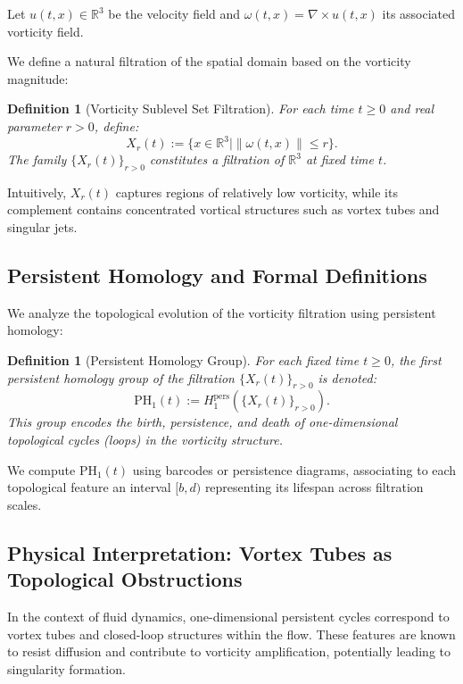 \documentclass[11pt]{article}
\newtheorem{definition}[theorem]{Definition}
\begin{document}
Let \( u(t,x) \in \mathbb{R}^3 \) be the velocity field and \( \omega(t,x) = \nabla \times u(t,x) \) its associated vorticity field.

We define a natural filtration of the spatial domain based on the vorticity magnitude:

\begin{definition}[Vorticity Sublevel Set Filtration]
For each time \( t \geq 0 \) and real parameter \( r > 0 \), define:
\[
X_r(t) := \{ x \in \mathbb{R}^3 \mid \|\omega(t,x)\| \leq r \}.
\]
The family \( \{ X_r(t) \}_{r > 0} \) constitutes a filtration of \( \mathbb{R}^3 \) at fixed time \( t \).
\end{definition}

Intuitively, \( X_r(t) \) captures regions of relatively low vorticity, while its complement contains concentrated vortical structures such as vortex tubes and singular jets.

\subsection{Persistent Homology and Formal Definitions}

We analyze the topological evolution of the vorticity filtration using persistent homology:

\begin{definition}[Persistent Homology Group]
For each fixed time \( t \geq 0 \), the first persistent homology group of the filtration \( \{ X_r(t) \}_{r>0} \) is denoted:
\[
\mathrm{PH}_1(t) := H_1^{\mathrm{pers}} \left( \{ X_r(t) \}_{r>0} \right).
\]
This group encodes the birth, persistence, and death of one-dimensional topological cycles (loops) in the vorticity structure.
\end{definition}

We compute \( \mathrm{PH}_1(t) \) using barcodes or persistence diagrams, associating to each topological feature an interval \( [b,d) \) representing its lifespan across filtration scales.

\subsection{Physical Interpretation: Vortex Tubes as Topological Obstructions}

In the context of fluid dynamics, one-dimensional persistent cycles correspond to vortex tubes and closed-loop structures within the flow. These features are known to resist diffusion and contribute to vorticity amplification, potentially leading to singularity formation.
\end{document}
